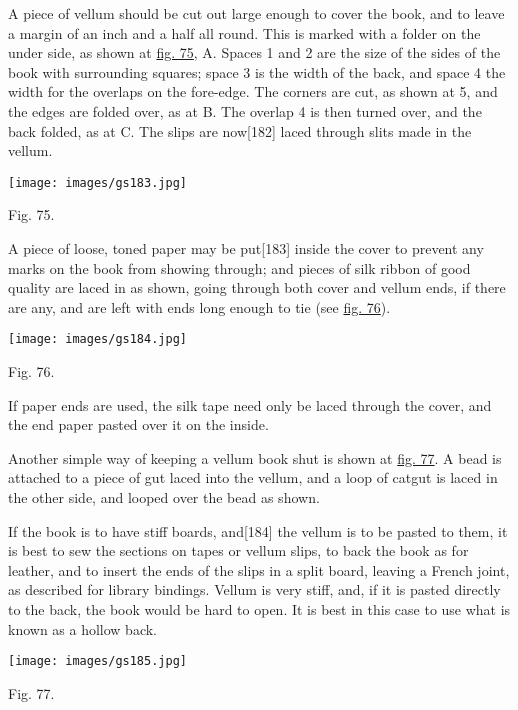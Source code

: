\documentclass[
]{article}
\begin{document}
A piece of vellum should be cut out large enough to cover the book, and
to leave a margin of an inch and a half all round. This is marked with a
folder on the under side, as shown at \protect\hyperlink{Fig_75}{fig.
75}, A. Spaces 1 and 2 are the size of the sides of the book with
surrounding squares; space 3 is the width of the back, and space 4 the
width for the overlaps on the fore-edge. The corners are cut, as shown
at 5, and the edges are folded over, as at B. The overlap 4 is then
turned over, and the back folded, as at C. The slips are
now{\protect\hypertarget{Page_182}{}{{[}182{]}}} laced through slits
made in the vellum.

\protect\hypertarget{Fig_75}{}{}
\texttt{[image: images/gs183.jpg]}

Fig. 75.

A piece of loose, toned paper may be
put{\protect\hypertarget{Page_183}{}{{[}183{]}}} inside the cover to
prevent any marks on the book from showing through; and pieces of silk
ribbon of good quality are laced in as shown, going through both cover
and vellum ends, if there are any, and are left with ends long enough to
tie (see \protect\hyperlink{Fig_76}{fig. 76}).

\protect\hypertarget{Fig_76}{}{}
\texttt{[image: images/gs184.jpg]}

Fig. 76.

If paper ends are used, the silk tape need only be laced through the
cover, and the end paper pasted over it on the inside.

Another simple way of keeping a vellum book shut is shown at
\protect\hyperlink{Fig_77}{fig. 77}. A bead is attached to a piece of
gut laced into the vellum, and a loop of catgut is laced in the other
side, and looped over the bead as shown.

If the book is to have stiff boards,
and{\protect\hypertarget{Page_184}{}{{[}184{]}}} the vellum is to be
pasted to them, it is best to sew the sections on tapes or vellum slips,
to back the book as for leather, and to insert the ends of the slips in
a split board, leaving a French joint, as described for library
bindings. Vellum is very stiff, and, if it is pasted directly to the
back, the book would be hard to open. It is best in this case to use
what is known as a hollow back.

\protect\hypertarget{Fig_77}{}{}
\texttt{[image: images/gs185.jpg]}

Fig. 77.
\end{document}
